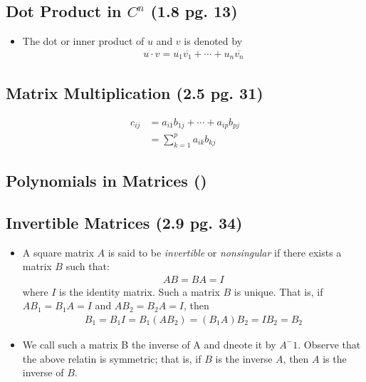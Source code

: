 \documentclass[hidelinks, 11pt, openleft]{scrartcl}
\begin{document}
\subsection*{Dot Product in $C^n$ (1.8 pg. 13)}
\begin{itemize}
    \item The dot or inner product of $u$ and $v$ is denoted by
    \begin{align*}
        u \cdot v = u_1\overline{v_1} + \cdots + u_n\overline{v_n}
    \end{align*}
\end{itemize}

\subsection*{Matrix Multiplication (2.5 pg. 31)}

    \begin{align*}
        c_{ij} &= a_{i1}b_{1j} + \cdots + a_{ip}b_{pj} \\
        &= \sum_{k=1}^{p} a_{ik}b_{kj}
    \end{align*}

\subsection*{Polynomials in Matrices ()}
\vspace{10 cm}

\subsection*{Invertible Matrices (2.9 pg. 34)}
\begin{itemize}
    \item A square matrix $A$ is said to be \textit{invertible} or \textit{nonsingular} if there exists a matrix $B$ such that: 
    \begin{align*}
        AB=BA=I
    \end{align*}
    where $I$ is the identity matrix. Such a matrix $B$ is unique. That is, if $AB_1=B_1A = I$ and $AB_2=B_2A=I$, then
    \begin{align*}
        B_1=B_1I=B_1(AB_2) = (B_1A)B_2=IB_2=B_2
    \end{align*}
    \item We call such a matrix B the inverse of A and dneote it by $A^-1$. Observe that the above relatin is symmetric; that is, if $B$ is the inverse $A$, then $A$ is the inverse of $B$.
\end{itemize}
\end{document}
